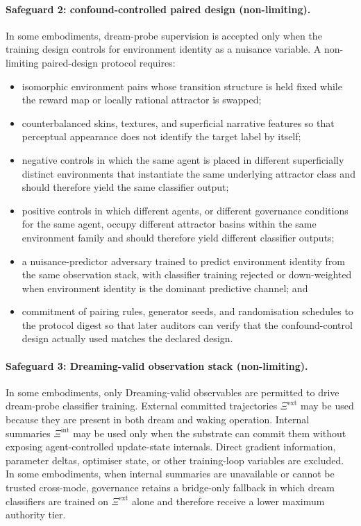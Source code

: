 \documentclass[a4paper,12pt]{article}
\begin{document}
\paragraph{Safeguard 2: confound-controlled paired design (non-limiting).}
In some embodiments, dream-probe supervision is accepted only when the
training design controls for environment identity as a nuisance
variable. A non-limiting paired-design protocol requires:
\begin{itemize}
  \item isomorphic environment pairs whose transition structure is held
    fixed while the reward map or locally rational attractor is swapped;
  \item counterbalanced skins, textures, and superficial narrative
    features so that perceptual appearance does not identify the target
    label by itself;
  \item negative controls in which the same agent is placed in
    different superficially distinct environments that instantiate the
    same underlying attractor class and should therefore yield the same
    classifier output;
  \item positive controls in which different agents, or different
    governance conditions for the same agent, occupy different
    attractor basins within the same environment family and should
    therefore yield different classifier outputs;
  \item a nuisance-predictor adversary trained to predict environment
    identity from the same observation stack, with classifier training
    rejected or down-weighted when environment identity is the dominant
    predictive channel; and
  \item commitment of pairing rules, generator seeds, and randomisation
    schedules to the protocol digest so that later auditors can verify
    that the confound-control design actually used matches the
    declared design.
\end{itemize}

\paragraph{Safeguard 3: Dreaming-valid observation stack (non-limiting).}
In some embodiments, only Dreaming-valid observables are permitted to drive
dream-probe classifier training. External committed trajectories
$\Xi^{\mathrm{ext}}$ may be used because they are present in both dream
and waking operation. Internal summaries $\Xi^{\mathrm{int}}$ may be
used only when the substrate can commit them without exposing
agent-controlled update-state internals. Direct gradient information,
parameter deltas, optimiser state, or other training-loop variables are
excluded. In some embodiments, when internal summaries are unavailable
or cannot be trusted cross-mode, governance retains a bridge-only
fallback in which dream classifiers are trained on $\Xi^{\mathrm{ext}}$
alone and therefore receive a lower maximum authority tier.
\end{document}
